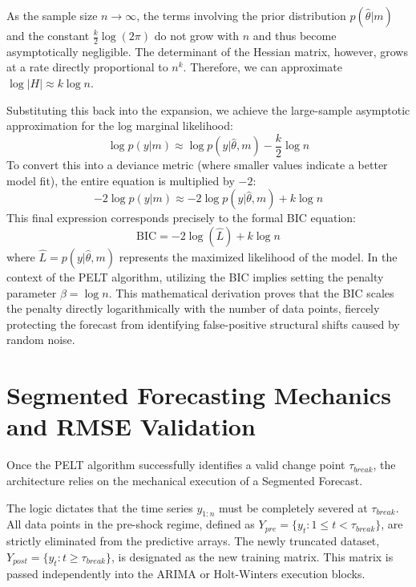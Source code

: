 \documentclass[11pt, a4paper]{report}
\begin{document}
As the sample size $n \to \infty$, the terms involving the prior distribution $p(\hat{\theta} | m)$ and the constant $\frac{k}{2} \log(2\pi)$ do not grow with $n$ and thus become asymptotically negligible. The determinant of the Hessian matrix, however, grows at a rate directly proportional to $n^k$. Therefore, we can approximate $\log |H| \approx k \log n$.

Substituting this back into the expansion, we achieve the large-sample asymptotic approximation for the log marginal likelihood:
\begin{equation}
    \log p(y | m) \approx \log p(y | \hat{\theta}, m) - \frac{k}{2} \log n
\end{equation}
To convert this into a deviance metric (where smaller values indicate a better model fit), the entire equation is multiplied by $-2$:
\begin{equation}
    -2 \log p(y | m) \approx -2 \log p(y | \hat{\theta}, m) + k \log n
\end{equation}
This final expression corresponds precisely to the formal BIC equation:
\begin{equation}
    \text{BIC} = -2 \log(\hat{L}) + k \log n
\end{equation}
where $\hat{L} = p(y | \hat{\theta}, m)$ represents the maximized likelihood of the model. In the context of the PELT algorithm, utilizing the BIC implies setting the penalty parameter $\beta = \log n$. This mathematical derivation proves that the BIC scales the penalty directly logarithmically with the number of data points, fiercely protecting the forecast from identifying false-positive structural shifts caused by random noise.

\section{Segmented Forecasting Mechanics and RMSE Validation}
Once the PELT algorithm successfully identifies a valid change point $\tau_{break}$, the architecture relies on the mechanical execution of a Segmented Forecast.

The logic dictates that the time series $y_{1:n}$ must be completely severed at $\tau_{break}$. All data points in the pre-shock regime, defined as $Y_{pre} = \{y_t : 1 \le t < \tau_{break}\}$, are strictly eliminated from the predictive arrays. The newly truncated dataset, $Y_{post} = \{y_t : t \ge \tau_{break}\}$, is designated as the new training matrix. This matrix is passed independently into the ARIMA or Holt-Winters execution blocks. 
\end{document}

